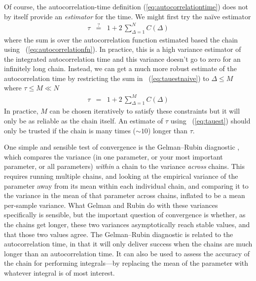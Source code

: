 \documentclass[modern]{aastex61}
\begin{document}
Of course, the autocorrelation-time definition
(\ref{eq:autocorrelationtime}) does not by itself provide an
\emph{estimator} for the time.
We might first try the na\"ive estimator
\begin{eqnarray}\label{eq:tauestnaive}
\tau &\stackrel{?}{=}& 1 + 2\,\sum_{\Delta = 1}^{N} C(\Delta)
\end{eqnarray}
where the sum is over the autocorrelation function estimated based the chain
using \equationname~(\ref{eq:autocorrelationfn}).
In practice, this is a high variance estimator of the integrated
autocorrelation time and this variance doesn't go to zero for an infinitely
long chain.
Instead, we can get a much more robust estimate of the autocorrelation time by
restricting the sum in \equationname~(\ref{eq:tauestnaive}) to $\Delta \le M$
where
$\tau \le M \ll N$
\begin{eqnarray}\label{eq:tauest}
\tau &=& 1 + 2\,\sum_{\Delta = 1}^{M} C(\Delta)
\end{eqnarray}
In practice, $M$ can be chosen iteratively to satisfy these constraints but it
will only be as reliable as the chain itself.
An estimate of $\tau$ using \equationname~(\ref{eq:tauest}) should only be
trusted if the chain is many times ($\sim 10$) longer than $\tau$.

One simple and sensible test of convergence is the Gelman--Rubin
diagnostic , which compares the variance
(in one parameter, or your most important parameter, or all
parameters) \emph{within} a chain to the variance \emph{across}
chains.
This requires running multiple chains, and looking at the empirical
variance of the parameter away from its mean within each individual
chain, and comparing it to the variance in the mean of that parameter
across chains, inflated to be a mean per-sample variance.
What Gelman and Rubin do with these variances specifically is
sensible, but the important question of convergence is whether, as the
chains get longer, these two variances asymptotically reach stable
values, and that those two values agree.
The Gelman--Rubin diagnostic is related to the autocorrelation time,
in that it will only deliver success when the chains are much longer
than an autocorrelation time.
It can also be used to assess the accuracy of the chain for performing
integrals---by replacing the mean of the parameter with whatever
integral is of most interest.
\end{document}
